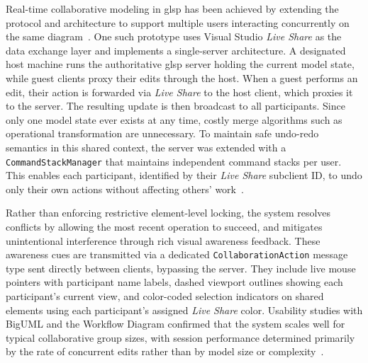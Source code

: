 Real-time collaborative modeling in \gls{glsp} has been achieved by extending the protocol and architecture to support multiple users interacting concurrently on the same diagram~\cite{hegedus_real-time_2023, helming_real-time_nodate}.
One such prototype uses Visual Studio \textit{Live Share} as the data exchange layer and implements a single-server architecture.
A designated host machine runs the authoritative \gls{glsp} server holding the current model state, while guest clients proxy their edits through the host.
When a guest performs an edit, their action is forwarded via \textit{Live Share} to the host client, which proxies it to the server.
The resulting update is then broadcast to all participants.
Since only one model state ever exists at any time, costly merge algorithms such as operational transformation are unnecessary.
To maintain safe undo-redo semantics in this shared context, the server was extended with a \texttt{CommandStackManager} that maintains independent command stacks per user.
This enables each participant, identified by their \textit{Live Share} subclient ID, to undo only their own actions without affecting others' work~\cite{hegedus_real-time_2023}.

Rather than enforcing restrictive element-level locking, the system resolves conflicts by allowing the most recent operation to succeed, and mitigates unintentional interference through rich visual awareness feedback.
These awareness cues are transmitted via a dedicated \texttt{CollaborationAction} message type sent directly between clients, bypassing the server.
They include live mouse pointers with participant name labels, dashed viewport outlines showing each participant's current view, and color-coded selection indicators on shared elements using each participant's assigned \textit{Live Share} color.
Usability studies with BigUML and the Workflow Diagram confirmed that the system scales well for typical collaborative group sizes, with session performance determined primarily by the rate of concurrent edits rather than by model size or complexity~\cite{hegedus_real-time_2023}.
